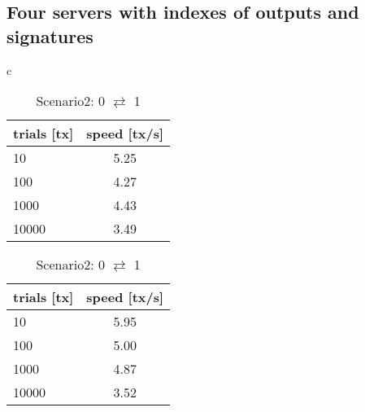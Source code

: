 \documentclass[a4j,11pt,uplatex,onecolumn]{article}
\begin{document}
\subsection{Four servers with indexes of outputs and signatures}
\begin{table}[htb]
    \begin{center}
        \begin{tabular}{c}

            \begin{minipage}{0.5\hsize}
                \begin{center}
                    \caption{Scenario1: 0 $\rightarrow$ 1}
                    \begin{tabular}{|l|c|} \hline
                        trials [tx] & speed [tx/s]\\ \hline \hline
                        10 & 5.25 \\
                        100 & 4.27 \\
                        1000 & 4.43 \\ 
                        10000 & 3.49 \\ \hline
                    \end{tabular}
                \end{center}
            \end{minipage}

            \begin{minipage}{0.5\hsize}
                \begin{center}
                    \caption{Scenario2: 0 $\rightleftarrows$ 1}
                    \begin{tabular}{|l|c|} \hline
                        trials [tx] & speed [tx/s]\\ \hline \hline
                        10 &  5.95 \\
                        100 & 5.00 \\
                        1000 & 4.87 \\
                        10000 & 3.52\\ \hline
                    \end{tabular}
                \end{center}
            \end{minipage}

        \end{tabular}
    \end{center}
\end{table}
\end{document}
